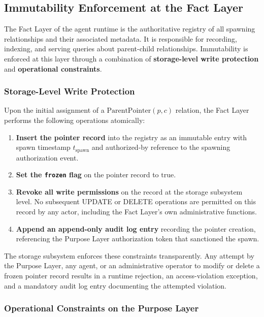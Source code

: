 \subsection{Immutability Enforcement at the Fact Layer}

The Fact Layer of the agent runtime is the authoritative registry of all spawning relationships and their associated metadata. It is responsible for recording, indexing, and serving queries about parent-child relationships. Immutability is enforced at this layer through a combination of \textbf{storage-level write protection} and \textbf{operational constraints}.

\subsubsection{Storage-Level Write Protection}

Upon the initial assignment of a \(\text{ParentPointer}(p, c)\) relation, the Fact Layer performs the following operations atomically:

\begin{enumerate}
    \item \textbf{Insert the pointer record} into the registry as an immutable entry with spawn timestamp \(t_{\text{spawn}}\) and authorized-by reference to the spawning authorization event.
    \item \textbf{Set the \texttt{frozen} flag} on the pointer record to \(\text{true}\).
    \item \textbf{Revoke all write permissions} on the record at the storage subsystem level. No subsequent UPDATE or DELETE operations are permitted on this record by any actor, including the Fact Layer's own administrative functions.
    \item \textbf{Append an append-only audit log entry} recording the pointer creation, referencing the Purpose Layer authorization token that sanctioned the spawn.
\end{enumerate}

The storage subsystem enforces these constraints transparently. Any attempt by the Purpose Layer, any agent, or an administrative operator to modify or delete a frozen pointer record results in a runtime rejection, an access-violation exception, and a mandatory audit log entry documenting the attempted violation.

\subsubsection{Operational Constraints on the Purpose Layer}

